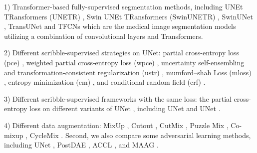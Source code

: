\documentclass[sigconf,natbib=false]{acmart}
\begin{document}
1) Transformer-based fully-supervised segmentation methods, including UNEt TRansformers (UNETR) \cite{Hatamizadeh_2022_WACV}, Swin UNEt TRansformers (SwinUNETR) \cite{swinunetr}, SwinUNet \cite{swinunet}, TransUNet \cite{chen2021transunet} and TFCNs \cite{li2022tfcns} which are the medical image segmentation models utilizing a combination of convolutional layers and Transformers.

2) Different scribble-supervised strategies on UNet: partial cross-entropy loss (pce) \cite{lin2016scribblesup}, 
weighted partial cross-entropy loss (wpce) \cite{MAAG}, uncertainty self-ensembling and transformation-consistent regularization (ustr) \cite{liu2022weakly}, mumford–shah Loss (mloss) \cite{kim2019mumford}, 
entropy minimization (em) \cite{EM}, and conditional random field (crf) \cite{crf}.

3) Different scribble-supervised frameworks with the same loss: the partial cross-entropy loss on different variants of UNet \cite{lin2016scribblesup}, including UNet \cite{unet+} 
and UNet \cite{unet++}.

4) Different data augmentation: MixUp \cite{mixup}, Cutout \cite{cutout}, CutMix \cite{cutmix}, Puzzle Mix \cite{puzzlemix}, Co-mixup \cite{comixup}, CycleMix \cite{Zhang_2022_CycleMix}.
Second, we also compare some adversarial learning methods, including UNet \cite{MAAG}, PostDAE \cite{postdae}, ACCL \cite{accl}, and MAAG \cite{MAAG}.
\end{document}
